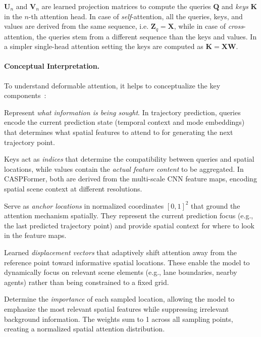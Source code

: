 \( \mathbf{U}_n \) and \( \mathbf{V}_n \) are learned projection matrices to compute the queries \(\mathbf{Q} \) and \emph{keys} \(\mathbf{K}\) in the \( n \)-th attention head. In case of \emph{self}-attention, all the queries, keys, and values are derived from the same sequence, i.e. \( \mathbf{Z}_q = \mathbf{X} \), while in case of \emph{cross}-attention, the queries stem from a different sequence than the keys and values. In a simpler single-head attention setting the keys are computed as \( \mathbf{K} = \mathbf{X}\mathbf{W} \).

\paragraph{Conceptual Interpretation.} To understand deformable attention, it helps to conceptualize the key components~\cite{copilotSonnet}:

\begin{description}[leftmargin=1em,itemsep=3pt]
\item[Queries (\(\mathbf{Q}\)).] Represent \emph{what information is being sought}. In trajectory prediction, queries encode the current prediction state (temporal context and mode embeddings) that determines what spatial features to attend to for generating the next trajectory point.

\item[Keys (\(\mathbf{K}\)) and Values (\(\mathbf{V}\)).] Keys act as \emph{indices} that determine the compatibility between queries and spatial locations, while values contain the \emph{actual feature content} to be aggregated. In CASPFormer, both are derived from the multi-scale CNN feature maps, encoding spatial scene context at different resolutions.

\item[Reference Points (\(\mathbf{p}_q\)).] Serve as \emph{anchor locations} in normalized coordinates \([0,1]^{2}\) that ground the attention mechanism spatially. They represent the current prediction focus (e.g., the last predicted trajectory point) and provide spatial context for where to look in the feature maps.

\item[Sampling Offsets (\(\boldsymbol{\Delta p}_{nkq}\)).] Learned \emph{displacement vectors} that adaptively shift attention away from the reference point toward informative spatial locations. These enable the model to dynamically focus on relevant scene elements (e.g., lane boundaries, nearby agents) rather than being constrained to a fixed grid.

\item[Attention Weights (\(A_{nkq}\)).] Determine the \emph{importance} of each sampled location, allowing the model to emphasize the most relevant spatial features while suppressing irrelevant background information. The weights sum to 1 across all sampling points, creating a normalized spatial attention distribution.
\end{description}


